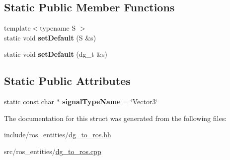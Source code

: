 \subsection*{Static Public Member Functions}
\begin{DoxyCompactItemize}
\item 
\mbox{\label{structdynamic__graph_1_1DgToRos_3_01specific_1_1Vector3_01_4_ad30846fa87d3c3fd7d4dd8e25a6b942c}} 
{\footnotesize template$<$typename S $>$ }\\static void {\bfseries set\+Default} (S \&s)
\item 
\mbox{\label{structdynamic__graph_1_1DgToRos_3_01specific_1_1Vector3_01_4_a8b63a4aa41ef13891faf99e680f2526c}} 
static void {\bfseries set\+Default} (dg\+\_\+t \&s)
\end{DoxyCompactItemize}
\subsection*{Static Public Attributes}
\begin{DoxyCompactItemize}
\item 
\mbox{\label{structdynamic__graph_1_1DgToRos_3_01specific_1_1Vector3_01_4_af9a61a47ac6c3a4f86f94227247293b1}} 
static const char $\ast$ {\bfseries signal\+Type\+Name} = \char`\"{}Vector3\char`\"{}
\end{DoxyCompactItemize}


The documentation for this struct was generated from the following files\+:\begin{DoxyCompactItemize}
\item 
include/ros\+\_\+entities/\hyperlink{dg__to__ros_8hh}{dg\+\_\+to\+\_\+ros.\+hh}\item 
src/ros\+\_\+entities/\hyperlink{dg__to__ros_8cpp}{dg\+\_\+to\+\_\+ros.\+cpp}\end{DoxyCompactItemize}

